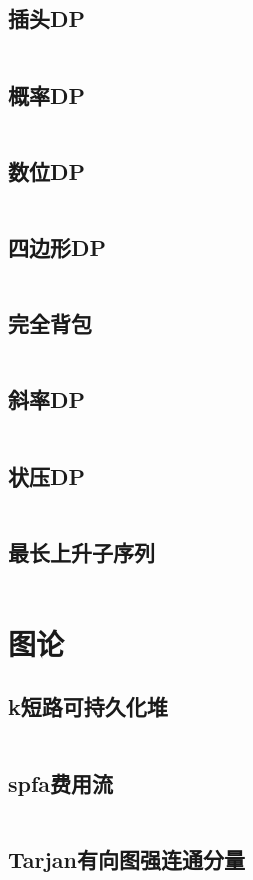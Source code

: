 \documentclass[UTF8]{ctexart}
\begin{document}
\subsection{插头DP}
\inputminted{cpp}{dp/插头dp.cpp}
\subsection{概率DP}
\inputminted{cpp}{dp/概率dp.cpp}
\subsection{数位DP}
\inputminted{cpp}{dp/数位dp.cpp}
\subsection{四边形DP}
\inputminted{cpp}{dp/四边形dp.cpp}
\subsection{完全背包}
\inputminted{cpp}{dp/完全背包.cpp}
\subsection{斜率DP}
\inputminted{cpp}{dp/斜率dp.cpp}
\subsection{状压DP}
\inputminted{cpp}{dp/状压dp.cpp}
\subsection{最长上升子序列}
\inputminted{cpp}{dp/最长上升子序列.cpp}
\section{图论}
\subsection{k短路可持久化堆}
\inputminted{cpp}{graphtheory/k短路可持久化堆.cpp}
\subsection{spfa费用流}
\inputminted{cpp}{graphtheory/spfa费用流.cpp}
\subsection{Tarjan有向图强连通分量}
\inputminted{cpp}{graphtheory/Tarjan有向图强连通分量.cpp}
\end{document}
